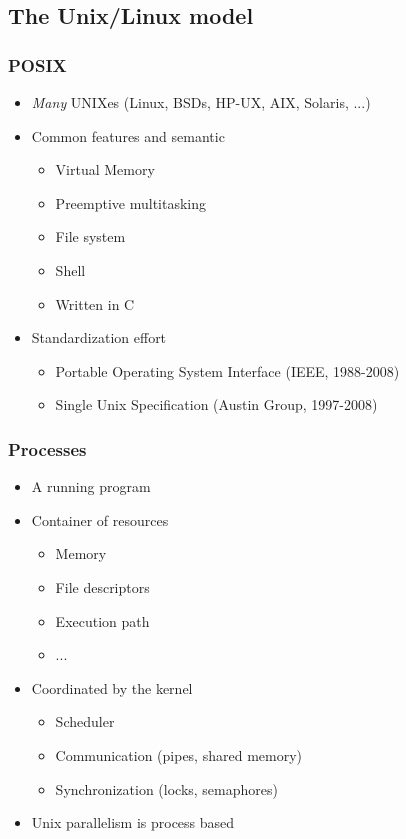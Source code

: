 \subsection{The Unix/Linux model}
\label{subsec:linuxmodel}


\begin{frame}
  \frametitle{POSIX}

  \begin{itemize}
  \item \emph{Many} UNIXes (Linux, BSDs, HP-UX, AIX, Solaris, ...)
  \item Common features and semantic
    \begin{itemize}
    \item Virtual Memory
    \item Preemptive multitasking
    \item File system
    \item Shell
    \item Written in C
    \end{itemize}
  \item Standardization effort
    \begin{itemize}
    \item Portable Operating System Interface (IEEE, 1988-2008)
    \item Single Unix Specification (Austin Group, 1997-2008)
    \end{itemize}
  \end{itemize}
\end{frame}


\begin{frame}
  \frametitle{Processes}

  \begin{itemize}
  \item A running program
  \item Container of resources
    \begin{itemize}
    \item Memory
    \item File descriptors
    \item Execution path
    \item ...
    \end{itemize}
  \item Coordinated by the kernel
    \begin{itemize}
    \item Scheduler
    \item Communication (pipes, shared memory)
    \item Synchronization (locks, semaphores)
    \end{itemize}
  \item Unix parallelism is process based
  \end{itemize}
\end{frame}



